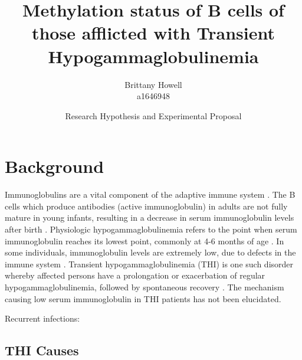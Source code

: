 \documentclass[12pt]{article}
\title{Methylation status of B cells of those afflicted with Transient Hypogammaglobulinemia}
\date{Research Hypothesis and Experimental Proposal}
\author{Brittany Howell \\ a1646948}
\begin{document}
	\maketitle
	
	\section{Background}
	
		Immunoglobulins are a vital component of the adaptive immune system \citep{Simon15}.  
		The B cells which produce antibodies (active immunoglobulin) in adults are not fully mature in young infants, resulting in a decrease in serum immunoglobulin levels after birth \citep{Martin10,Rechavi15,Stiemh80}. 
		Physiologic hypogammaglobulinemia refers to the point when serum immunoglobulin reaches its lowest point, commonly at 4-6 months of age \citep{Dressler89}. 
		In some individuals, immunoglobulin levels are extremely low, due to defects in the immune system \citep{AlHerz14}. 
		Transient hypogammaglobulinemia (THI) is one such disorder whereby affected persons have a prolongation or exacerbation of regular hypogammaglobulinemia, followed by spontaneous recovery \citep{Stiemh80,Dressler89,AlHerz14,Gitlin56,AlHerz11,Rosen66,McGeady87, Dalal98,Tiller78,Buckley83}.
		The mechanism causing low serum immunoglobulin in THI patients has not been elucidated. 
		
	
%	
	
	Recurrent infections: \citep{Rosen66}
		\subsection{THI Causes}
			
\end{document}

